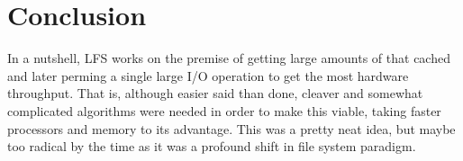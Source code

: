 \documentclass[12pt]{article}
\begin{document}
\section{Conclusion}
In a nutshell, LFS works on the premise of getting large amounts of that cached and later perming a single large I/O operation to get the most hardware throughput\cite{rosenblum1992design}. That is, although easier said than done, cleaver and somewhat complicated algorithms were needed in order to make this viable, taking faster processors and memory to its advantage. This was a pretty neat idea, but maybe too radical by the time as it was a profound shift in file system paradigm\cite{tweedie1998journaling}. 




\end{document}
